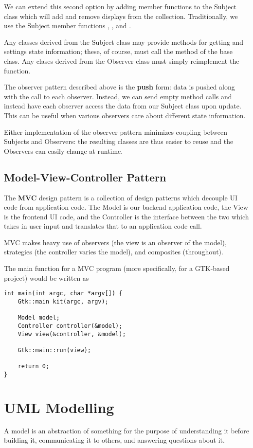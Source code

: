 \documentclass[12pt]{article}
\begin{document}
We can extend this second option by adding member functions to the Subject class which will add and remove displays from the collection. Traditionally, we use the Subject member functions , , and .

Any classes derived from the Subject class may provide methods for getting and settings state information; these, of course, must call the  method of the base class. Any clases derived from the Observer class must simply reimplement the  function.

The observer pattern described above is the {\bf push} form: data is pushed along with the  call to each observer. Instead, we can send empty  method calls and instead have each observer access the data from our Subject class upon update. This can be useful when various observers care about different state information.

Either implementation of the observer pattern minimizes coupling between Subjects and Observers: the resulting classes are thus easier to reuse and the Observers can easily change at runtime.

\subsection{Model-View-Controller Pattern}
The {\bf MVC} design pattern is a collection of design patterns which decouple UI code from application code. The Model is our backend application code, the View is the frontend UI code, and the Controller is the interface between the two which takes in user input and translates that to an application code call.

MVC makes heavy use of observers (the view is an observer of the model), strategies (the controller varies the model), and composites (throughout).

The main function for a MVC program (more specifically, for a GTK-based project) would be written as
\begin{verbatim}
int main(int argc, char *argv[]) {
    Gtk::main kit(argc, argv);

    Model model;
    Controller controller(&model);
    View view(&controller, &model);

    Gtk::main::run(view);

    return 0;
}
\end{verbatim}

\section{UML Modelling}
A model is an abstraction of something for the purpose of understanding it before building it, communicating it to others, and answering questions about it.
\end{document}
